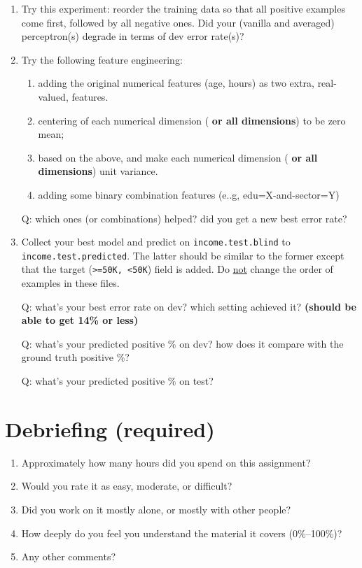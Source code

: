 \documentclass[11pt]{article}
\newcommand{\update}[1]{{\bf\color{black} #1}}
\begin{document}
\begin{enumerate}
\item
Try this experiment: reorder the training data so that all positive examples come first, followed by all negative ones. 
Did your (vanilla and averaged) perceptron(s) degrade in terms of dev error rate(s)?


\item
Try the following feature engineering: %
\begin{enumerate}
\item adding the original numerical features (age, hours) as two extra, real-valued, features.
\item centering of each numerical dimension (\update{or all dimensions}) to be zero mean;
\item based on the above, and make each numerical dimension (\update{or all dimensions}) unit variance.
\item adding some binary combination features (e..g, edu=X-and-sector=Y)
\end{enumerate}

Q: which ones (or combinations) helped? did you get a new best error rate?


\item Collect your best model and predict on {\tt income.test.blind} to {\tt income.test.predicted}. The latter should be similar to the former except that the target ({\tt >=50K, <50K}) field is added.
Do \underline{not} change the order of examples in these files.

Q: what's your best error rate on dev? which setting achieved it? 
\update{(should be able to get 14\% or less)}


Q: what's your  predicted positive \% on dev? how does it compare with the ground truth positive \%?

Q: what's your predicted positive \% on test?
\end{enumerate}

\bigskip
{\small
\section*{Debriefing (required)}
\begin{enumerate}
\item Approximately how many hours did you spend on this assignment?
\item Would you rate it as easy, moderate, or difficult?
\item Did you work on it mostly alone, or mostly with other people?
\item How deeply do you feel you understand the material it covers (0\%--100\%)?
\item Any other comments?
\end{enumerate}
}
\end{document}
